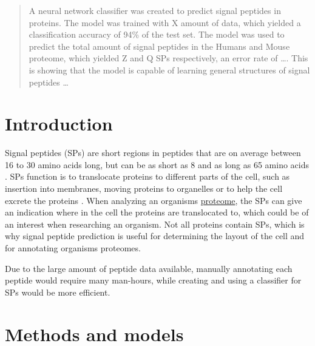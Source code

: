 \begin{abstract}
A neural network classifier was created to predict signal peptides in proteins. The model was trained with X amount of data, which yielded a classification accuracy of 94\% of the test set.
The model was used to predict the total amount of signal peptides in the Humans and Mouse proteome, which yielded Z and Q SPs respectively, an error rate of \dots.
This is showing that the model is capable of learning general structures of signal peptides \dots

\end{abstract}


\section{Introduction}


Signal peptides (SPs) are short regions in peptides that are on average between 16 to 30 amino acids long, but can be as short as 8 and as long as 65 amino acids \cite{sp_length}. SPs function is to translocate proteins to different parts of the cell, such as insertion into membranes, moving proteins to organelles or to help the cell excrete the proteins \cite{sp_wiki}. When analyzing an organisms  \href{https://en.wikipedia.org/wiki/Proteome}{proteome}, the SPs can give an indication where in the cell the proteins are translocated to, which could be of an interest when researching an organism. Not all proteins contain SPs, which is why signal peptide prediction is useful for determining the layout of the cell and for annotating organisms proteomes. 

Due to the large amount of peptide data available, manually annotating each peptide would require many man-hours, while creating and using a classifier for SPs would be more efficient.



\section{Methods and models}

